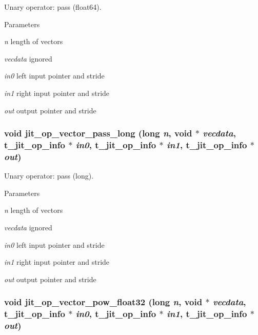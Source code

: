 Unary operator: pass (float64). 
\begin{DoxyParams}{Parameters}
\item[{\em n}]length of vectors \item[{\em vecdata}]ignored \item[{\em in0}]left input pointer and stride \item[{\em in1}]right input pointer and stride \item[{\em out}]output pointer and stride \end{DoxyParams}
\hypertarget{group__opvecmod_ga41ab0fc29cd955acb975666ebdc5b109}{
\subsubsection[{jit\_\-op\_\-vector\_\-pass\_\-long}]{\setlength{\rightskip}{0pt plus 5cm}void jit\_\-op\_\-vector\_\-pass\_\-long (long {\em n}, \/  void $\ast$ {\em vecdata}, \/  {\bf t\_\-jit\_\-op\_\-info} $\ast$ {\em in0}, \/  {\bf t\_\-jit\_\-op\_\-info} $\ast$ {\em in1}, \/  {\bf t\_\-jit\_\-op\_\-info} $\ast$ {\em out})}}
\label{group__opvecmod_ga41ab0fc29cd955acb975666ebdc5b109}


Unary operator: pass (long). 
\begin{DoxyParams}{Parameters}
\item[{\em n}]length of vectors \item[{\em vecdata}]ignored \item[{\em in0}]left input pointer and stride \item[{\em in1}]right input pointer and stride \item[{\em out}]output pointer and stride \end{DoxyParams}
\hypertarget{group__opvecmod_ga8e5c012f8dcf346065ce6011a676a8dc}{
\subsubsection[{jit\_\-op\_\-vector\_\-pow\_\-float32}]{\setlength{\rightskip}{0pt plus 5cm}void jit\_\-op\_\-vector\_\-pow\_\-float32 (long {\em n}, \/  void $\ast$ {\em vecdata}, \/  {\bf t\_\-jit\_\-op\_\-info} $\ast$ {\em in0}, \/  {\bf t\_\-jit\_\-op\_\-info} $\ast$ {\em in1}, \/  {\bf t\_\-jit\_\-op\_\-info} $\ast$ {\em out})}}
\label{group__opvecmod_ga8e5c012f8dcf346065ce6011a676a8dc}



